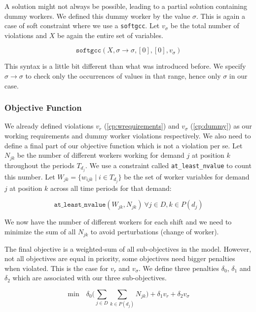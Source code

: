\documentclass[../../thesis.tex]{subfiles}
\begin{document}
A solution might not always be possible, leading to a partial solution containing dummy workers.
We defined this dummy worker by the value $\sigma$. This is again a case of soft constraint where 
we use a \texttt{softgcc}. Let $v_{\sigma}$ be the total number of violations and $X$ be again the entire set of variables.


\begin{equation}
  \texttt{softgcc}(X, \sigma \rightarrow \sigma, [0], [0], v_{\sigma}) \label{cp:dummy}
\end{equation}

This syntax is a little bit different than what was introduced before. We specify $\sigma \rightarrow \sigma$ to check only the occurrences of values 
in that range, hence only $\sigma$ in our case.




\subsubsection{Objective Function}

We already defined violations $v_r$ (\ref{cp:wrequirements}) and $v_{\sigma}$ (\ref{cp:dummy}) as our working requirements and dummy worker violations respectively.
We also need to define a final part of our objective function which is not a violation per se. Let $N_{jk}$ be the number 
of different workers working for demand $j$ at position $k$ throughout the periods $T_{d_j}$. We use a 
constraint called \texttt{at\_least\_nvalue} \cite{nvalue} to count this number.
Let  $W_{jk} = \{ w_{ijk} \mid i \in T_{d_j} \}$ be the set of worker variables for demand $j$ at position $k$ across all time periods for that demand:

\begin{equation}
  \texttt{at\_least\_nvalue}(W_{jk}, N_{jk}) \ \forall j \in D, k \in P(d_j)
\end{equation}

We now have the number of different workers for each shift and we need to minimize the sum of all $N_{jk}$ to avoid perturbations (change of worker).

The final objective is a weighted-sum of all sub-objectives in the model. However, not all objectives are equal 
in priority, some objectives need bigger penalties when violated. This is the case for $v_r$ and $v_{\sigma}$.
We define three penalties $\delta_0$, $\delta_1$ and $\delta_2$ which are associated with our three sub-objectives.

\begin{equation}
  \text{min} \quad \delta_0 \big( \sum_{j \in D} \sum_{k \in P(d_j)} N_{jk} \big) + \delta_1 v_r + \delta_2 v_{\sigma} \label{cp:objective}
\end{equation}
\end{document}
